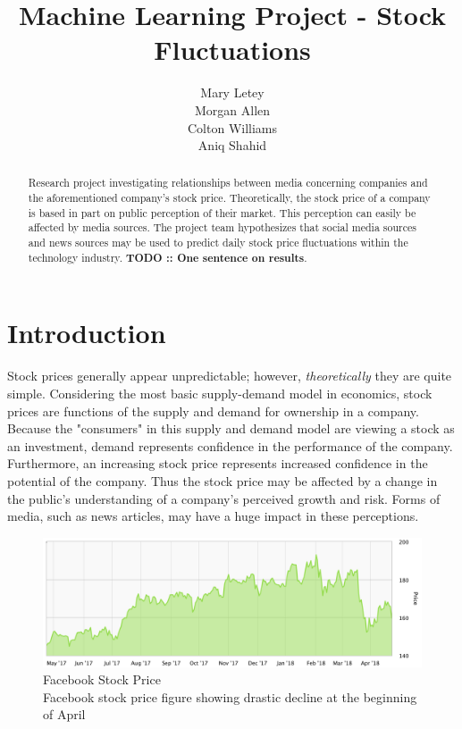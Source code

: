 \documentclass{article}
\title{Machine Learning Project - Stock Fluctuations}
\author{
  Mary Letey \\
  \And
  Morgan Allen \\
  \And
  Colton Williams \\
  \And
  Aniq Shahid 
}
\begin{document}
\maketitle

\begin{abstract}
  Research project investigating relationships between media concerning companies and the aforementioned company's stock price. Theoretically, the stock price of a company is based in part on public perception of their market. This perception can easily be affected by media sources. The project team hypothesizes that social media sources and news sources may be used to predict daily stock price fluctuations within the technology industry. \textbf{TODO :: One sentence on results}.
\end{abstract}
 
\section{Introduction}

Stock prices generally appear unpredictable; however, \emph{theoretically} they are quite simple. Considering the most basic supply-demand model in economics, stock prices are functions of the supply and demand for ownership in a company. Because the "consumers" in this supply and demand model are viewing a stock as an investment, demand represents confidence in the performance of the company. Furthermore, an increasing stock price represents increased confidence in the potential of the company. Thus the stock price may be affected by a change in the public's understanding of a company's perceived growth and risk. Forms of media, such as news articles, may have a huge impact in these perceptions.

\begin{figure}[H]
    \includegraphics[scale=0.5]{FacebookYear.png}
  \caption{Facebook Stock Price \\
  \small Facebook stock price figure showing drastic decline at the beginning of April}
  \label{fig:faceplant}
\end{figure}
\end{document}
